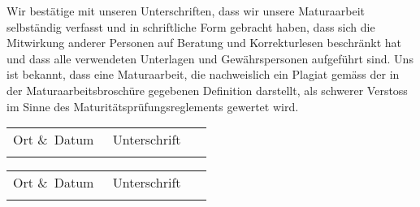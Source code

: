 
Wir bestätige mit unseren Unterschriften, dass wir unsere Maturaarbeit selbständig verfasst und in schriftliche Form gebracht haben, dass sich die Mitwirkung anderer Personen auf Beratung und Korrekturlesen beschränkt hat und dass alle verwendeten Unterlagen und Gewährspersonen aufgeführt sind. Uns ist bekannt, dass eine Maturaarbeit, die nachweislich ein Plagiat gemäss der in der Maturaarbeitsbroschüre gegebenen Definition darstellt, als schwerer Verstoss im Sinne des Maturitätsprüfungsreglements gewertet wird.

\vspace{3cm}

\noindent
\begin{tabular}{p{0.47\linewidth}p{0.47\linewidth}}
  Ort \&\ Datum & Unterschrift \\
  & \\[1cm]
  \hline
\end{tabular}
\vspace{3cm}

\noindent
\begin{tabular}{p{0.47\linewidth}p{0.47\linewidth}}
	Ort \&\ Datum & Unterschrift \\
	& \\[1cm]
	\hline
\end{tabular}
